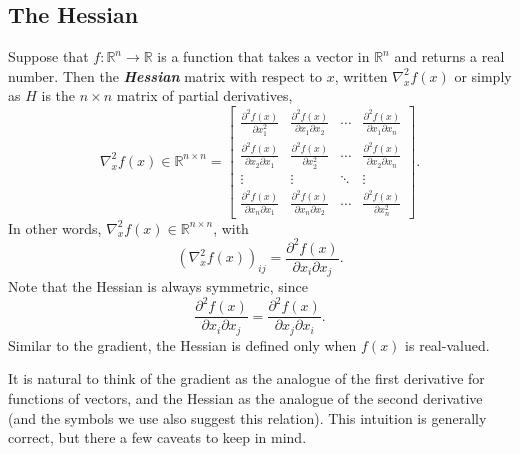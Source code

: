\documentclass[12pt]{article}
\begin{document}
\subsection{The Hessian}
Suppose that $f:\mathbb{R}^n \rightarrow \mathbb{R}$ is a function
that takes a vector in $\mathbb{R}^n$ and returns a real number.  Then
the \textbf{\textit{Hessian}} matrix with respect to $x$, written
$\nabla_x^2 f(x)$ or simply as $H$ is the $n \times n$ matrix of
partial derivatives, 
\[\nabla^2_x f(x) \in \mathbb{R}^{n \times n} = \left [
  \begin{array}{cccc} \frac{\partial^2 f(x)}{\partial x_1^2} & 
  \frac{\partial^2 f(x)}{\partial x_1 \partial x_2} & \cdots &
  \frac{\partial^2 f(x)}{\partial x_1 \partial x_n}  \\
  \frac{\partial^2 f(x)}{\partial x_2 \partial x_1} & 
  \frac{\partial^2 f(x)}{\partial x_2^2}  & \cdots & \frac{\partial^2
  f(x)}{\partial x_2 \partial x_n}  \\
  \vdots & \vdots & \ddots & \vdots \\ \frac{\partial^2 f(x)}{\partial
  x_n \partial x_1}  & \frac{\partial^2 f(x)}{\partial x_n \partial
  x_2} & \cdots & \frac{\partial^2 f(x)}{\partial x_n^2}
  \end{array} \right ].\]
In other words, $\nabla_x^2 f(x) \in \mathbb{R}^{n \times n}$, with
\[(\nabla^2_x f(x))_{ij} = \frac{\partial^2 f(x)}{\partial x_i
  \partial x_j}.\]
Note that the Hessian is always symmetric, since
\[\frac{\partial^2 f(x)}{\partial x_i \partial x_j} = \frac{\partial^2
  f(x)}{\partial x_j \partial x_i}.\]
Similar to the gradient, the Hessian is defined only when $f(x)$ is
real-valued.  

It is natural to think of the gradient as the analogue
of the first derivative for functions of vectors, and the Hessian as
the analogue of the second derivative (and the symbols we use also
suggest this relation).  This intuition is generally
correct, but there a few caveats to keep in mind.
\end{document}
